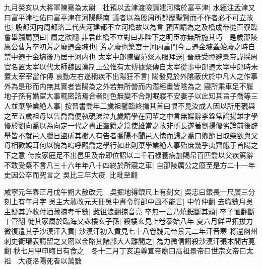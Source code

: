 九月癸亥以大將軍陳騫為太尉　杜預以孟津渡險請建河橋於富平津|{
	水經注孟津又曰富平津杜佑曰富平津在河陽縣南}
議者以為殷周所都歷聖賢而不作者必不可立故也|{
	殷都河内周都洛二代夾河建都不立河橋故以為言}
預固請為之及橋成帝從百寮臨會舉觴屬預曰|{
	屬之欲翻}
非君此橋不立對曰非陛下之明臣亦無所施其巧　是歲邵陵厲公曹芳卒初芳之廢遷金墉也|{
	芳之廢也築宮于河内重門今言遷金墉蓋始廢之時自禁中遷于金墉後乃居于河内也}
太宰中郎陳留范粲素服拜送|{
	晉既受禪避景帝諱採周官名置太宰以代太師魏因漢制上公惟有太傅據粲傳自太宰從事中郎遷太宰中郎時未置太宰宰當作傅}
哀動左右遂稱疾不出陽狂不言|{
	陽發見於外隂蔽伏於中凡人之作事外為是形而内無其實者皆陽為之外若無所營而内濳經畫皆陰為之}
寢所乘車足不履地子孫有婚宦大事輒密諮焉合者則色無變不合則眠寢不安妻子以此知其旨子喬等三人並棄學業絶人事|{
	按晉書喬年二歲祖馨臨終撫其首曰恨不見汝成人因以所用硯與之至五歲祖母以告喬喬便執硯涕泣九歲請學在同輩之中言無媟辭李銓常論揚雄才學優於劉向喬以為向定一代之書正羣籍之篇使雄當之故非所長遂著劉揚優劣論前後辟舉皆不就邑人臘日盜斫其樹人有告者喬陽不聞邑人愧而歸之喬曰卿節日取柴欲與父母相歡娛耳何以愧為嗚呼觀喬之學行如此則棄學業絶人事殆庶幾乎夷齊餓于首陽之下之意}
侍疾家庭足不出邑里及帝即位詔以二千石禄養病加賜帛百匹喬以父疾篤辭不敢受粲不言凡三十六年年八十四終於所寢之車|{
	自卲陵厲公之廢至是方二十一年史因公卒而究言之}
吳比三年大疫|{
	比毗至翻}


咸寧元年春正月戊午朔大赦改元　吳掘地得銀尺上有刻文|{
	吳志曰銀長一尺廣三分刻上有年月字}
吳主大赦改元天冊吳中書令賀邵中風不能言|{
	中竹仲翻}
去職數月吳主疑其詐收付酒藏掠考千數|{
	藏徂浪翻掠音亮}
卒無一言乃燒鋸斷其頭|{
	卒子恤翻斷丅管翻}
徙其家屬於臨海又誅樓玄子孫|{
	殺樓玄見上卷泰始八年}
夏六月鮮卑拓拔力微復遣其子沙漠汗入貢|{
	沙漠汗初入貢見七十八卷魏元帝景元二年汗音寒}
將還幽州刺史衛瓘表請留之又密以金賂其諸部大人離間之|{
	為力微信譖殺沙漠汗張本間古莧翻}
秋七月甲申晦日有食之　冬十二月丁亥追尊宣帝廟曰高祖景帝曰世宗文帝曰太祖　大疫洛陽死者以萬數

